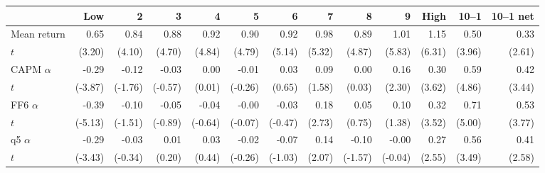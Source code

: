 \begin{tabular}{lrrrrrrrrrrrr}
\toprule
 & Low & 2 & 3 & 4 & 5 & 6 & 7 & 8 & 9 & High & 10--1 & 10--1 net \\
\midrule
Mean return & 0.65 & 0.84 & 0.88 & 0.92 & 0.90 & 0.92 & 0.98 & 0.89 & 1.01 & 1.15 & 0.50 & 0.33 \\
$t$ & (3.20) & (4.10) & (4.70) & (4.84) & (4.79) & (5.14) & (5.32) & (4.87) & (5.83) & (6.31) & (3.96) & (2.61) \\
CAPM $\alpha$ & -0.29 & -0.12 & -0.03 & 0.00 & -0.01 & 0.03 & 0.09 & 0.00 & 0.16 & 0.30 & 0.59 & 0.42 \\
$t$ & (-3.87) & (-1.76) & (-0.57) & (0.01) & (-0.26) & (0.65) & (1.58) & (0.03) & (2.30) & (3.62) & (4.86) & (3.44) \\
FF6 $\alpha$ & -0.39 & -0.10 & -0.05 & -0.04 & -0.00 & -0.03 & 0.18 & 0.05 & 0.10 & 0.32 & 0.71 & 0.53 \\
$t$ & (-5.13) & (-1.51) & (-0.89) & (-0.64) & (-0.07) & (-0.47) & (2.73) & (0.75) & (1.38) & (3.52) & (5.00) & (3.77) \\
q5 $\alpha$ & -0.29 & -0.03 & 0.01 & 0.03 & -0.02 & -0.07 & 0.14 & -0.10 & -0.00 & 0.27 & 0.56 & 0.41 \\
$t$ & (-3.43) & (-0.34) & (0.20) & (0.44) & (-0.26) & (-1.03) & (2.07) & (-1.57) & (-0.04) & (2.55) & (3.49) & (2.58) \\
\bottomrule
\end{tabular}
